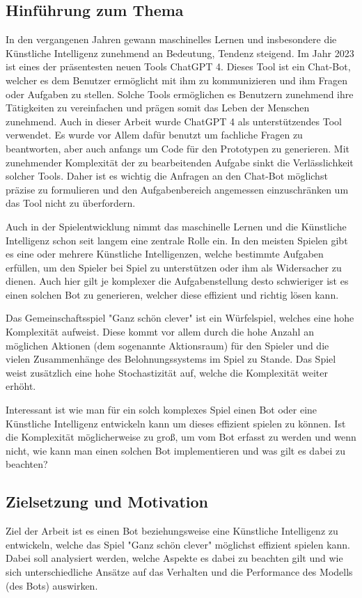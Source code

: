 \subsection{Hinführung zum Thema}
In den vergangenen Jahren gewann maschinelles Lernen und insbesondere die Künstliche Intelligenz zunehmend an Bedeutung, Tendenz steigend. Im Jahr 2023 ist eines der präsentesten neuen Tools ChatGPT 4. Dieses Tool ist ein Chat-Bot, welcher es dem Benutzer ermöglicht mit ihm zu kommunizieren und ihm Fragen oder Aufgaben zu stellen. Solche Tools ermöglichen es Benutzern zunehmend ihre Tätigkeiten zu vereinfachen und prägen somit das Leben der Menschen zunehmend. Auch in dieser Arbeit wurde ChatGPT 4 als unterstützendes Tool verwendet. Es wurde vor Allem dafür benutzt um fachliche Fragen zu beantworten, aber auch anfangs um Code für den Prototypen zu generieren. Mit zunehmender Komplexität der zu bearbeitenden Aufgabe sinkt die Verlässlichkeit solcher Tools. Daher ist es wichtig die Anfragen an den Chat-Bot möglichst präzise zu formulieren und den Aufgabenbereich angemessen einzuschränken um das Tool nicht zu überfordern.

Auch in der Spielentwicklung nimmt das maschinelle Lernen und die Künstliche Intelligenz schon seit langem eine zentrale Rolle ein. In den meisten Spielen gibt es eine oder mehrere Künstliche Intelligenzen, welche bestimmte Aufgaben erfüllen, um den Spieler bei Spiel zu unterstützen oder ihm als Widersacher zu dienen. Auch hier gilt je komplexer die Aufgabenstellung desto schwieriger ist es einen solchen Bot zu generieren, welcher diese effizient und richtig lösen kann.

Das Gemeinschaftsspiel "Ganz schön clever" ist ein Würfelspiel, welches eine hohe Komplexität aufweist. Diese kommt vor allem durch die hohe Anzahl an möglichen Aktionen (dem sogenannte Aktionsraum) für den Spieler und die vielen Zusammenhänge des Belohnungssystems im Spiel zu Stande. Das Spiel weist zusätzlich eine hohe Stochastizität auf, welche die Komplexität weiter erhöht.

Interessant ist wie man für ein solch komplexes Spiel einen Bot oder eine Künstliche Intelligenz entwickeln kann um dieses effizient spielen zu können. Ist die Komplexität möglicherweise zu groß, um vom Bot erfasst zu werden und wenn nicht, wie kann man einen solchen Bot implementieren und was gilt es dabei zu beachten?
\subsection{Zielsetzung und Motivation}
Ziel der Arbeit ist es einen Bot beziehungsweise eine Künstliche Intelligenz zu entwickeln, welche das Spiel "Ganz schön clever" möglichst effizient spielen kann. Dabei soll analysiert werden, welche Aspekte es dabei zu beachten gilt und wie sich unterschiedliche Ansätze auf das Verhalten und die Performance des Modells (des Bots) auswirken.

